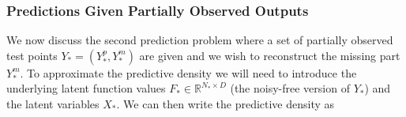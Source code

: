 %




\subsubsection{\label{predictions2} Predictions Given Partially Observed Outputs}

We now discuss the second prediction problem where a set of partially 
observed test points $Y_* = (Y_*^p,Y_*^m)$ are given and 
we wish to reconstruct the missing part $Y_*^m$.
To approximate the predictive density 
we will need to introduce the underlying latent function
values $F_* \in \mathbb{R}^{N_* \times D}$ (the noisy-free version of $Y_*$)
and the latent variables $X_*$. We can then write the predictive density as

